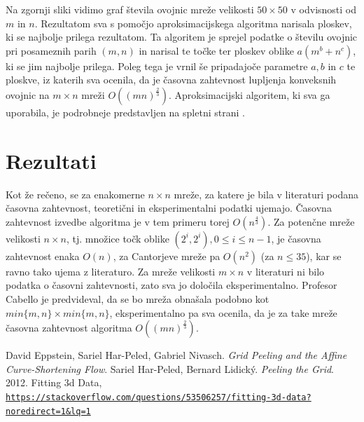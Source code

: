 \documentclass[a4paper]{article}
\begin{document}
\newpage
Na zgornji sliki vidimo graf števila ovojnic mreže velikosti $50 \times 50$ v odvisnosti od $m$ in $n$. Rezultatom sva s pomočjo aproksimacijskega algoritma narisala ploskev, ki se najbolje
prilega rezultatom. Ta algoritem je sprejel podatke o številu ovojnic pri posameznih parih $(m, n)$ in narisal te točke ter ploskev oblike $a(m^b + n^c)$, ki se jim najbolje prilega.
Poleg tega je vrnil še pripadajoče parametre $a, b$ in $c$ te ploskve, iz katerih sva ocenila, da je časovna zahtevnost lupljenja konveksnih ovojnic na $m \times n$ mreži 
$O((mn)^{\frac{2}{3}})$. Aproksimacijski algoritem, ki sva ga uporabila, je podrobneje predstavljen na spletni strani \cite{aproksimacija}.

\newpage
\section{Rezultati}
Kot že rečeno, se za enakomerne $n \times n$ mreže, za katere je bila v literaturi podana časovna zahtevnost, teoretični in eksperimentalni podatki ujemajo. Časovna zahtevnost izvedbe algoritma
je v tem primeru torej $O(n ^ \frac{4}{3})$. Za potenčne mreže velikosti $n \times n$, tj. množice točk oblike $(2^i, 2^i), 0 \leq i \leq n - 1$, je časovna zahtevnost enaka
$O(n)$, za Cantorjeve mreže pa $O(n^2)$ (za $n \leq 35$), kar se ravno tako ujema z literaturo.
Za mreže velikosti $m \times n$ v literaturi ni bilo podatka o časovni zahtevnosti, zato sva jo določila eksperimentalno. Profesor Cabello je predvideval,
da se bo mreža obnašala podobno kot $min\{m,n\}\times min\{m,n\}$, eksperimentalno
pa sva ocenila, da je za take mreže časovna zahtevnost algoritma $O((mn)^{\frac{2}{3}})$. 

\begin{thebibliography}{3}
    David Eppstein, Sariel Har-Peled, Gabriel Nivasch. \textit{Grid Peeling and the Affine Curve-Shortening Flow}.
    Sariel Har-Peled, Bernard Lidický. \textit{Peeling the Grid}. 2012.
    Fitting 3d Data, \\\href{https://stackoverflow.com/questions/53506257/fitting-3d-data?noredirect=1&lq=1}
    {\texttt{https://stackoverflow.com/questions/53506257/fitting-3d-data?noredirect=1\&lq=1}}
\end{thebibliography}
\end{document}
